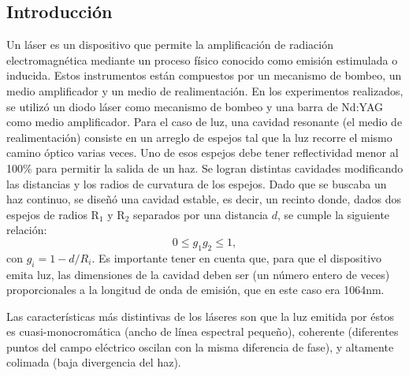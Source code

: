 \documentclass[10pt, a4paper]{article}%
\begin{document}
\begin{multicols}{2} %

\section*{Introducción}

Un láser es un dispositivo que permite la amplificación de radiación electromagnética mediante un proceso físico conocido como emisión estimulada o inducida. Estos instrumentos están compuestos por un mecanismo de bombeo, un medio amplificador y un medio de realimentación. En los experimentos realizados, se utilizó un diodo láser como mecanismo de bombeo y una barra de Nd:YAG como medio amplificador. Para el caso de luz, una cavidad resonante (el medio de realimentación) consiste en un arreglo de espejos tal que la luz recorre el mismo camino óptico varias veces. Uno de esos espejos debe tener reflectividad menor al 100\% para permitir la salida de un haz. Se logran distintas cavidades modificando las distancias y los radios de curvatura de los espejos. Dado que se buscaba un haz continuo, se diseñó una cavidad estable, es decir, un recinto donde, dados dos espejos de radios R$_1$ y R$_2$ separados por una distancia $d$, se cumple la siguiente relación:
\begin{equation}
    0 \leq g_1 g_2 \leq 1,
\end{equation}
con $g_i = 1 - d/R_i$. Es importante tener en cuenta que, para que el dispositivo emita luz, las dimensiones de la cavidad deben ser (un número entero de veces) proporcionales a la longitud de onda de emisión, que en este caso era 1064nm.

Las características más distintivas de los láseres son que la luz emitida por éstos es cuasi-monocromática (ancho de línea espectral pequeño), coherente (diferentes puntos del campo eléctrico oscilan con la misma diferencia de fase), y altamente colimada (baja divergencia del haz).



\end{multicols}
\end{document}
